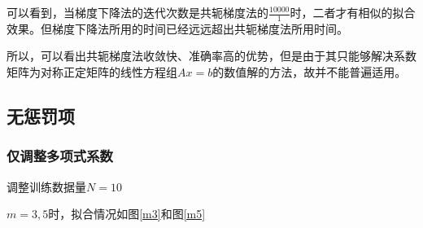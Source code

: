 可以看到，当梯度下降法的迭代次数是共轭梯度法的$\frac{10000}{1}$时，二者才有相似的拟合效果。但梯度下降法所用的时间已经远远超出共轭梯度法所用时间。

所以，可以看出共轭梯度法收敛快、准确率高的优势，但是由于其只能够解决系数矩阵为对称正定矩阵的线性方程组$A x = b$的数值解的方法，故并不能普遍适用。

\subsection{无惩罚项}

\subsubsection{仅调整多项式系数}

调整训练数据量$N = 10$

$m = 3, 5$时，拟合情况如图\ref{m3}和图\ref{m5}

